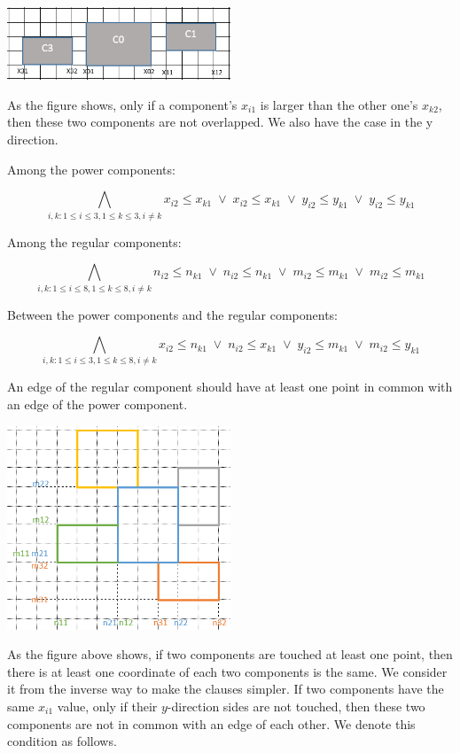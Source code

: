 \documentclass[11pt]{article}
\begin{document}
{\begin{description}
\begin{center}
\includegraphics[width=0.5\textwidth]{Part1_2_1.png}
\end{center}
  As the figure shows, only if a component's $x_{i1}$ is larger than the other one's $x_{k2}$, then these two components are not overlapped. We also have the case in the y direction.

  Among the power components:

  \[  \bigwedge_{i,k: 1 \leq i \leq 3, 1 \leq k \leq 3, i \neq k}
  x_{i2} \leq x_{k1} \; \vee \; x_{i2} \leq x_{k1} \; \vee \; y_{i2} \leq y_{k1} \; \vee \; y_{i2} \leq y_{k1} \]

  Among the regular components:

  \[  \bigwedge_{i,k: 1 \leq i \leq 8, 1 \leq k \leq 8, i \neq k}
  n_{i2} \leq n_{k1} \; \vee \; n_{i2} \leq n_{k1} \; \vee \; m_{i2} \leq m_{k1} \; \vee \; m_{i2} \leq m_{k1}  \]

  Between the power components and the regular components:

  \[  \bigwedge_{i,k: 1 \leq i \leq 3, 1 \leq k \leq 8, i \neq k}
   x_{i2} \leq n_{k1} \; \vee \; n_{i2} \leq x_{k1} \; \vee \; y_{i2} \leq m_{k1} \; \vee \; m_{i2} \leq y_{k1} \]

  \item[Constraint 4:] An edge of the regular component should have at least one point in common with an edge of the power component.

\begin{center}
\includegraphics[width=0.5\textwidth]{Part1_2_2.png}
\end{center}

  As the figure above shows, if two components are touched at least one point, then there is at least one coordinate of each two components is the same. We consider it from the inverse way to make the clauses simpler. If two components have the same $x_{i1}$ value, only if their $y$-direction sides are not touched, then these two components are not in common with an edge of each other.
  We denote this condition as follows.


\end{description}}
\end{document}
